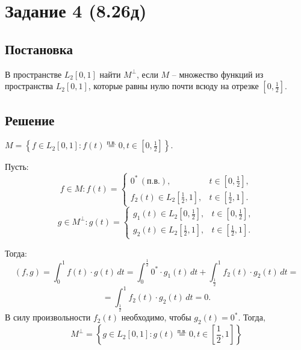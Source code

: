\documentclass[14pt, a4paper, titlepage, fleqn]{extarticle}
\begin{document}
    

    \pagebreak
    \section{Задание 4 (8.26д)}

        \subsection{Постановка}
        В пространстве \( L_2 [ 0, 1 ] \) найти \( M^\perp \), если \( M \) -- множество функций из пространства \( L_2[0, 1] \), которые равны нулю почти всюду на отрезке \( \left[ 0, \frac{1}{2} \right] \).
        
        \subsection{Решение}
        \( M = \left\{ f \in L_2 [ 0, 1 ]: f(t) \stackrel{\text{п.в.}}{=} 0, t \in \left[ 0, \frac{1}{2} \right] \right\} \).
        
        Пусть:
        \[
            f \in M: f(t) = \begin{cases}
                0^* \, (\text{п.в.}), & t \in \left[ 0, \frac{1}{2} \right], \\
                f_2(t) \in L_2\left[ \frac{1}{2}, 1 \right], & t\in \left[ \frac{1}{2}, 1 \right].
            \end{cases}
        \]
        \[
            g \in M^\perp: g(t) = \begin{cases}
                g_1(t) \in L_2\left[ 0, \frac{1}{2} \right], & t \in \left[ 0, \frac{1}{2} \right], \\
                g_2(t) \in L_2\left[ \frac{1}{2}, 1 \right], & t \in \left[ \frac{1}{2}, 1 \right].
            \end{cases}
        \]

        Тогда:
        \[
            (f, g) = \int_{0}^{1} f(t) \cdot g(t) \, dt = 
            \int_{0}^{\frac{1}{2}} 0^* \cdot g_1(t) \, dt + \int_{\frac{1}{2}}^{1} f_2(t) \cdot g_2(t) \, dt =
        \]
        \[
            = \int_{\frac{1}{2}}^{1} f_2(t) \cdot g_2(t) \, dt = 0.
        \]
        В силу произвольности \( f_2(t) \) необходимо, чтобы \( g_2(t) = 0^* \). Тогда,
        \[
            M^\perp = \left\{ g \in L_2 [ 0, 1 ]: g(t) \stackrel{\text{п.в.}}{=} 0, t \in \left[ \frac{1}{2}, 1 \right] \right\}
        \]
\end{document}
